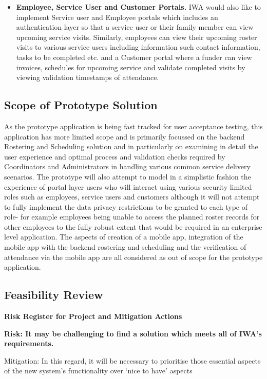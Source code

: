 \documentclass[a4paper,12pt]{article}
\begin{document}
\begin{samepage}
\begin{samepage}
\begin{itemize}
\item \textbf {Employee, Service User and Customer Portals.} IWA would also like to implement Service user and Employee portals which includes an authentication layer so that a service user or their family member can view upcoming service visits. Similarly, employees can view their upcoming roster visits to various service users including information such contact information, tasks to be completed etc. and a Customer portal where a funder can view invoices, schedules for upcoming service and validate completed visits by viewing validation timestamps of attendance.
\end{itemize}
\subsection {Scope of Prototype Solution}
As the prototype application is being fast tracked for user acceptance testing, this application has more limited scope and is primarily focussed on the backend Rostering and Scheduling solution and in particularly on examining in detail the user experience and optimal process and validation checks required by Coordinators and Administrators in handling various common service delivery scenarios.
The prototype will also attempt to model in a simplistic fashion the experience of portal layer users who will interact using various security limited roles such as employees, service users and customers although it will not attempt to fully implement the data privacy restrictions to be granted to each type of role- for example employees being unable to access the planned roster records for other employees to the fully robust extent that would be required in an enterprise level application.
The aspects of creation of a mobile app, integration of the mobile app with the backend rostering and scheduling and the verification of attendance via the mobile app are all considered as out of scope for the prototype application.
\end{samepage}
\pagebreak
\subsection {Feasibility Review}

\textbf{Risk Register for Project and Mitigation Actions}

\noindent\makebox[\linewidth]{\rule{\paperwidth}{0.4pt}}
\textbf{Risk: It may be challenging to find a solution which meets all of IWA’s requirements.}

Mitigation: In this regard, it will be necessary to prioritise those essential aspects of the new system’s functionality over ‘nice to have’ aspects


\end{samepage}
\end{document}
